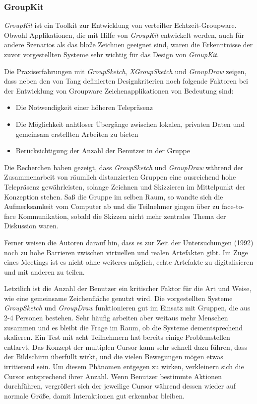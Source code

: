 \subsubsection{GroupKit} 
\emph{GroupKit} ist ein Toolkit zur Entwicklung von verteilter Echtzeit-Groupware. Obwohl Applikationen, die mit Hilfe von \emph{GroupKit} entwickelt werden, auch für andere Szenarios als das bloße Zeichnen geeignet sind, waren die Erkenntnisse der zuvor vorgestellten Systeme sehr wichtig für das Design von \emph{GroupKit}.

Die Praxiserfahrungen mit \emph{GroupSketch}, \emph{XGroupSketch} und \emph{GroupDraw} zeigen, dass neben den von Tang definierten Designkriterien \citep{TangJC:1989} noch folgende Faktoren bei der Entwicklung von Groupware Zeichenapplikationen von Bedeutung sind:

\begin{itemize}
	\item
	Die Notwendigkeit einer höheren Telepräsenz
	\item
	Die Möglichkeit nahtloser Übergänge zwischen lokalen, privaten Daten und gemeinsam erstellten Arbeiten zu bieten
	\item
	Berücksichtigung der Anzahl der Benutzer in der Gruppe
\end{itemize}

Die Recherchen \citep{Greenberg:1992p207} haben gezeigt, dass \emph{GroupSketch} und \emph{GroupDraw} während der Zusammenarbeit von räumlich distanzierten Gruppen eine ausreichend hohe Telepräsenz gewährleisten, solange Zeichnen und Skizzieren im Mittelpunkt der Konzeption stehen. Saß die Gruppe im selben Raum, so wandte sich die Aufmerksamkeit vom Computer ab und die Teilnehmer gingen über zu face-to-face Kommunikation, sobald die Skizzen nicht mehr zentrales Thema der Diskussion waren. 

Ferner weisen die Autoren \citep{Greenberg:1992p207} darauf hin, dass es zur Zeit der Untersuchungen (1992) noch zu hohe Barrieren zwischen virtuellen und realen Artefakten gibt. Im Zuge eines Meetings ist es nicht ohne weiteres möglich, echte Artefakte zu digitalisieren und mit anderen zu teilen.

Letztlich ist die Anzahl der Benutzer ein kritischer Faktor für die Art und Weise, wie eine gemeinsame Zeichenfläche genutzt wird. Die vorgestellten Systeme \emph{GroupSketch} und \emph{GroupDraw} funktionieren gut im Einsatz mit Gruppen, die aus 2-4 Personen bestehen. Sehr häufig arbeiten aber weitaus mehr Menschen zusammen und es bleibt die Frage im Raum, ob die Systeme dementsprechend skalieren. Ein Test mit acht Teilnehmern hat bereits einige Problemstellen entlarvt. Das Konzept der multiplen Cursor kann sehr schnell dazu führen, dass der Bildschirm überfüllt wirkt, und die vielen Bewegungen mögen etwas irritierend sein. Um diesem Phänomen entgegen zu wirken, verkleinern sich die Cursor entsprechend ihrer Anzahl. Wenn Benutzer bestimmte Aktionen durchführen, vergrößert sich der jeweilige Cursor während dessen wieder auf normale Größe, damit Interaktionen gut erkennbar bleiben. 

